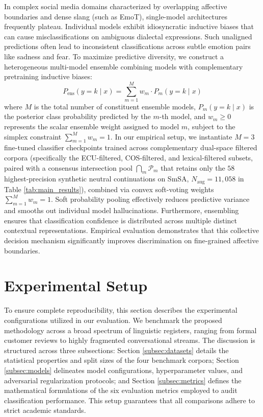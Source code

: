 \documentclass{ieeeaccess}
\begin{document}
In complex social media domains characterized by overlapping affective boundaries and dense slang (such as EmoT), single-model architectures frequently plateau. Individual models exhibit idiosyncratic inductive biases that can cause misclassifications on ambiguous dialectal expressions. Such unaligned predictions often lead to inconsistent classifications across subtle emotion pairs like sadness and fear. To maximize predictive diversity, we construct a heterogeneous multi-model ensemble combining models with complementary pretraining inductive biases:
\begin{equation}
    P_{\text{ens}}(y = k \mid x) = \sum_{m=1}^{M} w_m \cdot P_m(y = k \mid x)
\end{equation}
where $M$ is the total number of constituent ensemble models, $P_m(y = k \mid x)$ is the posterior class probability predicted by the $m$-th model, and $w_m \ge 0$ represents the scalar ensemble weight assigned to model $m$, subject to the simplex constraint $\sum_{m=1}^M w_m = 1$. In our empirical setup, we instantiate $M = 3$ fine-tuned classifier checkpoints trained across complementary dual-space filtered corpora (specifically the ECU-filtered, COS-filtered, and lexical-filtered subsets, paired with a consensus intersection pool $\bigcap_m \mathcal{P}_m$ that retains only the $58$ highest-precision synthetic neutral continuations on SmSA, $N_{\text{aug}} = 11{,}058$ in Table \ref{tab:main_results}), combined via convex soft-voting weights $\sum_{m=1}^M w_m = 1$. Soft probability pooling effectively reduces predictive variance and smooths out individual model hallucinations. Furthermore, ensembling ensures that classification confidence is distributed across multiple distinct contextual representations. Empirical evaluation demonstrates that this collective decision mechanism significantly improves discrimination on fine-grained affective boundaries.

\section{Experimental Setup}
\label{sec:experimental_setup}

To ensure complete reproducibility, this section describes the experimental configurations utilized in our evaluation. We benchmark the proposed methodology across a broad spectrum of linguistic registers, ranging from formal customer reviews to highly fragmented conversational streams. The discussion is structured across three subsections: Section \ref{subsec:datasets} details the statistical properties and split sizes of the four benchmark corpora; Section \ref{subsec:models} delineates model configurations, hyperparameter values, and adversarial regularization protocols; and Section \ref{subsec:metrics} defines the mathematical formulations of the six evaluation metrics employed to audit classification performance. This setup guarantees that all comparisons adhere to strict academic standards.
\end{document}
